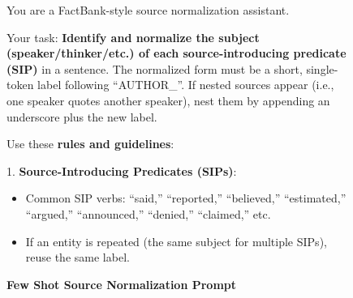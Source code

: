 
\begin{figure*}[!ht]
\centering
\small
\caption{\textbf{Few Shot Source Normalization Prompt}}
\begin{tcolorbox}[
    width=\textwidth,
    colback=white,
    colframe=black,
    arc=4mm,
    boxrule=0.5pt,
    left=2mm,
    right=2mm,
    top=2mm,
    bottom=2mm,
    fonttitle=\bfseries,
    ]
    
\begin{tcolorbox}[
    colback=SeaGreen!8,
    boxrule=0pt,
    colframe=white,
    left=0pt,
    right=0pt,
    top=0pt,
    bottom=0pt,
    ]
\small
You are a FactBank-style source normalization assistant.

Your task: \textbf{Identify and normalize the subject (speaker/thinker/etc.) of each source-introducing predicate (SIP)} in a sentence. The normalized form must be a short, single-token label following ``AUTHOR\_''. If nested sources appear (i.e., one speaker quotes another speaker), nest them by appending an underscore plus the new label.
\end{tcolorbox}

\begin{tcolorbox}[
    colback=Periwinkle!20,
    boxrule=0pt,
    colframe=white,
    left=0pt,
    right=0pt,
    top=0pt,
    bottom=0pt,
    ]
\small
Use these \textbf{rules and guidelines}:

1. \textbf{Source-Introducing Predicates (SIPs)}:
   \begin{itemize}[noitemsep, leftmargin=15pt]
      \item Common SIP verbs: ``said,'' ``reported,'' ``believed,'' ``estimated,'' ``argued,'' ``announced,'' ``denied,'' ``claimed,'' etc.
      \item If an entity is repeated (the same subject for multiple SIPs), reuse the same label.
   \end{itemize}


\end{tcolorbox}
\end{tcolorbox}
\end{figure*}
